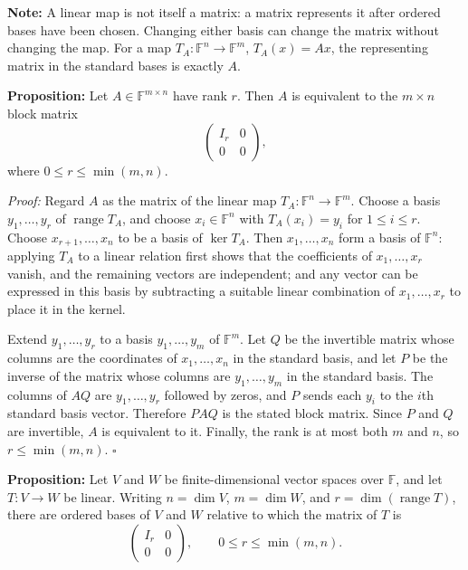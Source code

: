 \documentclass[a4paper,11pt,abstract=true]{scrartcl}
\theoremstyle{dotlessP}
\theoremstyle{dotlessS}
\theoremstyle{remark}
\theoremstyle{definition}
\begin{document}
\begin{remark_box}
\textbf{Note:} A linear map is not itself a
matrix: a matrix represents it after ordered bases have been chosen.
Changing either basis can change the matrix without changing the map.
For a map $T_A:\mathbb{F}^n\longrightarrow\mathbb{F}^m$, $T_A(x)=Ax$,
the representing matrix in the standard bases is exactly $A$.
\end{remark_box}

\begin{problem_box}
\textbf{Proposition:} Let $A\in\mathbb{F}^{m\times n}$ have rank $r$.
Then $A$ is equivalent to the $m\times n$ block matrix
\[
\begin{pmatrix}
I_r & 0\\
0 & 0
\end{pmatrix},
\]
where $0\leq r\leq\min(m,n)$.
\end{problem_box}

\begin{claim_box}
\textit{Proof:} Regard $A$ as the matrix of the linear map
$T_A:\mathbb{F}^n\to\mathbb{F}^m$. Choose a basis
$y_1,\ldots,y_r$ of $\operatorname{range}T_A$, and choose
$x_i\in\mathbb{F}^n$ with $T_A(x_i)=y_i$ for $1\leq i\leq r$.
Choose $x_{r+1},\ldots,x_n$ to be a basis of $\ker T_A$. Then
$x_1,\ldots,x_n$ form a basis of $\mathbb{F}^n$: applying $T_A$
to a linear relation first shows that the coefficients of
$x_1,\ldots,x_r$ vanish, and the remaining vectors are independent;
and any vector can be expressed in this basis by subtracting a suitable
linear combination of $x_1,\ldots,x_r$ to place it in the kernel.

Extend $y_1,\ldots,y_r$ to a basis $y_1,\ldots,y_m$ of
$\mathbb{F}^m$. Let $Q$ be the invertible matrix whose columns are the
coordinates of $x_1,\ldots,x_n$ in the standard basis, and let $P$ be
the inverse of the matrix whose columns are $y_1,\ldots,y_m$ in the
standard basis. The columns of $AQ$ are $y_1,\ldots,y_r$ followed by
zeros, and $P$ sends each $y_i$ to the $i$th standard basis vector.
Therefore $PAQ$ is the stated block matrix. Since $P$ and $Q$ are
invertible, $A$ is equivalent to it. Finally, the rank is at most both
$m$ and $n$, so $r\leq\min(m,n)$. \hfill$\square$
\end{claim_box}

\begin{problem_box}
\textbf{Proposition:} Let $V$ and $W$ be finite-dimensional vector
spaces over $\mathbb{F}$, and let $T:V\longrightarrow W$ be linear.
Writing $n=\dim V$, $m=\dim W$, and
$r=\dim(\operatorname{range}T)$, there are ordered bases of $V$ and
$W$ relative to which the matrix of $T$ is
\[
\begin{pmatrix}
I_r & 0\\
0 & 0
\end{pmatrix},
\qquad 0\leq r\leq\min(m,n).
\]
\end{problem_box}
\end{document}
